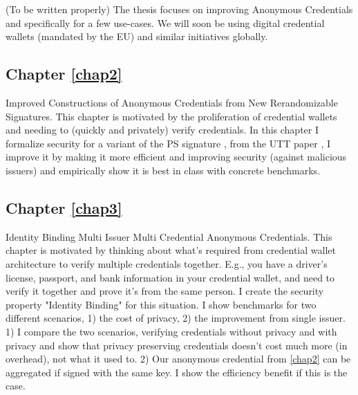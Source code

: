 (To be written properly)
The thesis focuses on improving Anonymous Credentials and specifically for a few use-cases. We will soon be using digital credential wallets (mandated by the EU) \cite{european_parliament_meps_2024} and similar initiatives globally. 


\subsection{Chapter \ref{chap2}}
Improved Constructions of Anonymous Credentials from New Rerandomizable Signatures. This chapter is motivated by the proliferation of credential wallets and needing to (quickly and privately) verify credentials. 
In this chapter I formalize security for a variant of the PS signature \cite{sako_short_2016}, from the UTT paper \cite{tomescu_utt_2022}, I improve it by making it more efficient and improving security (against malicious issuers) and empirically show it is best in class with concrete benchmarks. 


\subsection{Chapter \ref{chap3}}
Identity Binding Multi Issuer Multi Credential Anonymous Credentials. This chapter is motivated by thinking about what's required from credential wallet architecture to verify multiple credentials together. E.g., you have a driver's license, passport, and bank information in your credential wallet, and need to verify it together and prove it's from the same person. I create the security property "Identity Binding" for this situation. I show benchmarks for two different scenarios, 1) the cost of privacy, 2) the improvement from single issuer.
1) I compare the two scenarios, verifying credentials without privacy and with privacy and show that privacy preserving credentials doesn't cost much more (in overhead), not what it used to. 2) Our anonymous credential from \ref{chap2} can be aggregated if signed with the same key. I show the efficiency benefit if this is the case. 

